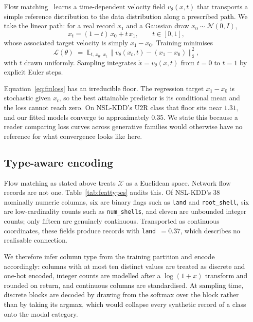 \documentclass[11pt]{article}
\begin{document}
Flow matching~\cite{lipman2023flow} learns a time-dependent velocity field
$v_\theta(x,t)$ that transports a simple reference distribution to the data
distribution along a prescribed path. We take the linear path: for a real record
$x_1$ and a Gaussian draw $x_0 \sim \mathcal{N}(0,I)$,
\begin{equation}
x_t = (1-t)\,x_0 + t\,x_1 ,
\qquad t \in [0,1],
\end{equation}
whose associated target velocity is simply $x_1 - x_0$. Training minimises
\begin{equation}
\mathcal{L}(\theta) \;=\;
\mathbb{E}_{t,\,x_0,\,x_1}
\bigl\lVert v_\theta(x_t,t) - (x_1 - x_0) \bigr\rVert_2^2 ,
\label{eq:fmloss}
\end{equation}
with $t$ drawn uniformly. Sampling integrates $\dot{x} = v_\theta(x,t)$ from $t=0$
to $t=1$ by explicit Euler steps.

Equation~\eqref{eq:fmloss} has an irreducible floor. The regression target
$x_1-x_0$ is stochastic given $x_t$, so the best attainable predictor is its
conditional mean and the loss cannot reach zero. On NSL-KDD's U2R class that floor
sits near $1.31$, and our fitted models converge to approximately $0.35$. We state
this because a reader comparing loss curves across generative families would
otherwise have no reference for what convergence looks like here.

\subsection*{Type-aware encoding}

Flow matching as stated above treats $\mathcal{X}$ as a Euclidean space. Network
flow records are not one. Table~\ref{tab:feattypes} audits this. Of NSL-KDD's 38 nominally numeric columns,
six are binary
flags such as \texttt{land} and \texttt{root\_shell}, six are low-cardinality counts
such as \texttt{num\_shells}, and eleven are unbounded integer counts; only fifteen
are genuinely continuous. Transported as continuous coordinates, these fields
produce records with \texttt{land}~$=0.37$, which describes no realisable
connection.



We therefore infer column type from the training partition and encode accordingly:
columns with at most ten distinct values are treated as discrete and one-hot
encoded, integer counts are modelled after a $\log(1+x)$ transform and rounded on
return, and continuous columns are standardised. At sampling time, discrete blocks
are decoded by drawing from the softmax over the block rather than by taking its
argmax, which would collapse every synthetic record of a class onto the modal
category.
\end{document}
